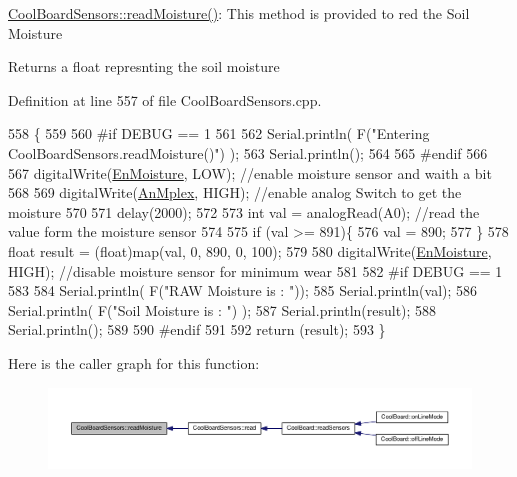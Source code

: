 \hyperlink{class_cool_board_sensors_a8761bff50373c485f4465c8db47d0633}{Cool\+Board\+Sensors\+::read\+Moisture()}\+: This method is provided to red the Soil Moisture

\begin{DoxyReturn}{Returns}
a float represnting the soil moisture 
\end{DoxyReturn}


Definition at line 557 of file Cool\+Board\+Sensors.\+cpp.


\begin{DoxyCode}
558 \{
559 
560 \textcolor{preprocessor}{#if DEBUG == 1}
561     
562     Serial.println( F(\textcolor{stringliteral}{"Entering CoolBoardSensors.readMoisture()"}) );
563     Serial.println();
564     
565 \textcolor{preprocessor}{#endif}
566 
567     digitalWrite(\hyperlink{class_cool_board_sensors_a6177d02e14a057a2f171a2e930b5038d}{EnMoisture}, LOW);                 \textcolor{comment}{//enable moisture sensor and waith a bit}
568 
569     digitalWrite(\hyperlink{class_cool_board_sensors_a12ef28b1046219e0aee10bf64e28c4a5}{AnMplex}, HIGH);         \textcolor{comment}{//enable analog Switch to get the moisture}
570 
571     delay(2000);
572 
573     \textcolor{keywordtype}{int} val = analogRead(A0);                       \textcolor{comment}{//read the value form the moisture sensor}
574 
575     \textcolor{keywordflow}{if} (val >= 891)\{
576         val = 890;
577     \}
578     \textcolor{keywordtype}{float} result = (float)map(val, 0, 890, 0, 100); 
579 
580     digitalWrite(\hyperlink{class_cool_board_sensors_a6177d02e14a057a2f171a2e930b5038d}{EnMoisture}, HIGH);                  \textcolor{comment}{//disable moisture sensor for minimum wear}
581     
582 \textcolor{preprocessor}{#if DEBUG == 1 }
583 
584     Serial.println( F(\textcolor{stringliteral}{"RAW Moisture  is : "}));
585     Serial.println(val);
586     Serial.println( F(\textcolor{stringliteral}{"Soil Moisture is : "}) );
587     Serial.println(result);
588     Serial.println();
589 
590 \textcolor{preprocessor}{#endif }
591 
592     \textcolor{keywordflow}{return} (result);
593 \}
\end{DoxyCode}
Here is the caller graph for this function\+:\nopagebreak
\begin{figure}[H]
\begin{center}
\leavevmode
\includegraphics[width=350pt]{de/d46/class_cool_board_sensors_a8761bff50373c485f4465c8db47d0633_icgraph}
\end{center}
\end{figure}
\mbox{\label{class_cool_board_sensors_a6944b6ea7bce8e2fce1b434acfd9d5f3}} 
